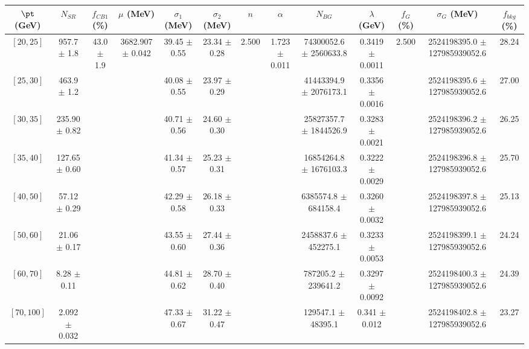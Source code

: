 \begin{tabular}{c||c|c|c|c|c|c|c|c|c|c|c||c}
$\pt$ (GeV) & $N_{SR}$ & $f_{CB1}$ (\%) & $\mu$ (MeV) & $\sigma_1$ (MeV) & $\sigma_2$ (MeV) & $n$ & $\alpha$ & $N_{BG}$ & $\lambda$ (GeV) & $f_G$ (\%) & $\sigma_G$ (MeV) & $f_{bkg}$ (\%) \\
\hline
$[20, 25]$ & 957.7 $\pm$ 1.8 & \multirow{8}{*}{43.0 $\pm$ 1.9} & \multirow{8}{*}{3682.907 $\pm$ 0.042} & 39.45 $\pm$ 0.55 & 23.34 $\pm$ 0.28 & \multirow{8}{*}{2.500} & \multirow{8}{*}{1.723 $\pm$ 0.011} & 74300052.6 $\pm$ 2560633.8 & 0.3419 $\pm$ 0.0011 & \multirow{8}{*}{2.500} & 2524198395.0 $\pm$ 127985939052.6 & 28.24\\
$[25, 30]$ & 463.9 $\pm$ 1.2 &  &  & 40.08 $\pm$ 0.55 & 23.97 $\pm$ 0.29 &  &  & 41443394.9 $\pm$ 2076173.1 & 0.3356 $\pm$ 0.0016 &  & 2524198395.6 $\pm$ 127985939052.6 & 27.00\\
$[30, 35]$ & 235.90 $\pm$ 0.82 &  &  & 40.71 $\pm$ 0.56 & 24.60 $\pm$ 0.30 &  &  & 25827357.7 $\pm$ 1844526.9 & 0.3283 $\pm$ 0.0021 &  & 2524198396.2 $\pm$ 127985939052.6 & 26.25\\
$[35, 40]$ & 127.65 $\pm$ 0.60 &  &  & 41.34 $\pm$ 0.57 & 25.23 $\pm$ 0.31 &  &  & 16854264.8 $\pm$ 1676103.3 & 0.3222 $\pm$ 0.0029 &  & 2524198396.8 $\pm$ 127985939052.6 & 25.70\\
$[40, 50]$ & 57.12 $\pm$ 0.29 &  &  & 42.29 $\pm$ 0.58 & 26.18 $\pm$ 0.33 &  &  & 6385574.8 $\pm$ 684158.4 & 0.3260 $\pm$ 0.0032 &  & 2524198397.8 $\pm$ 127985939052.6 & 25.13\\
$[50, 60]$ & 21.06 $\pm$ 0.17 &  &  & 43.55 $\pm$ 0.60 & 27.44 $\pm$ 0.36 &  &  & 2458837.6 $\pm$ 452275.1 & 0.3233 $\pm$ 0.0053 &  & 2524198399.1 $\pm$ 127985939052.6 & 24.24\\
$[60, 70]$ & 8.28 $\pm$ 0.11 &  &  & 44.81 $\pm$ 0.62 & 28.70 $\pm$ 0.40 &  &  & 787205.2 $\pm$ 239641.2 & 0.3297 $\pm$ 0.0092 &  & 2524198400.3 $\pm$ 127985939052.6 & 24.39\\
$[70, 100]$ & 2.092 $\pm$ 0.032 &  &  & 47.33 $\pm$ 0.67 & 31.22 $\pm$ 0.47 &  &  & 129547.1 $\pm$ 48395.1 & 0.341 $\pm$ 0.012 &  & 2524198402.8 $\pm$ 127985939052.6 & 23.27\\
\end{tabular}
